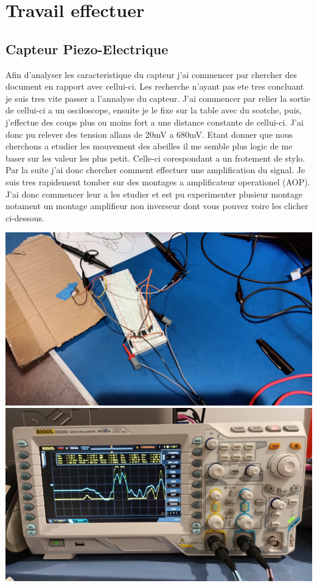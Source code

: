 \documentclass[5pt]{article}
\begin{document}
\section{Travail effectuer}
\subsection{Capteur Piezo-Electrique}

Afin d'analyser les caracteristique du capteur j'ai commencer par chercher des document en rapport avec cellui-ci. Les recherche n'ayant pas 
ete tres concluant je suis tres vite passer a l'annalyse du capteur. J'ai commencer par relier la sortie de cellui-ci a un osciloscope, ensuite je le fixe
sur la table avec du scotche, puis, j'effectue des coups plus ou moins fort a une distance constante de cellui-ci. J'ai donc pu relever des tension allans de 20mV a 680mV.
Etant donner que nous cherchons a etudier les mouvement des abeilles il me semble plus logic de me baser sur les valeur les plus petit. Celle-ci corespondant a un frotement de stylo.
Par la suite j'ai donc chercher comment effectuer une amplification du signal. Je suis tres rapidement tomber sur des montages a amplificateur operationel (AOP). J'ai donc commencer leur
a les etudier et est pu experimenter plusieur montage notament un montage amplifieur non inverseur dont vous pouvez voire les clicher ci-dessous.

\begin{center}	
	\includegraphics[scale=0.08]{montage_piezo_aop.jpg}
	\label{image3}
	\includegraphics[scale=0.08]{sortie_osciloscope.jpg}
	\label{image4}
\end{center}
	
\end{document}
